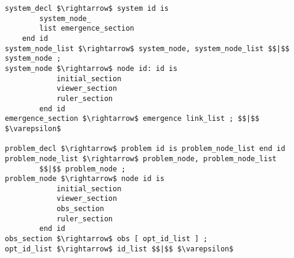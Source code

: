 \begin{lstlisting}
system_decl $\rightarrow$ system id is 
		system_node_
		list emergence_section  
	end id
system_node_list $\rightarrow$ system_node, system_node_list $$|$$ system_node ;
system_node $\rightarrow$ node id: id is 
			initial_section 
			viewer_section 
			ruler_section 
		end id
emergence_section $\rightarrow$ emergence link_list ; $$|$$ $\varepsilon$

problem_decl $\rightarrow$ problem id is problem_node_list end id
problem_node_list $\rightarrow$ problem_node, problem_node_list 
		$$|$$ problem_node ;
problem_node $\rightarrow$ node id is 
			initial_section 
			viewer_section 
			obs_section 
			ruler_section 
		end id
obs_section $\rightarrow$ obs [ opt_id_list ] ;
opt_id_list $\rightarrow$ id_list $$|$$ $\varepsilon$
\end{lstlisting}